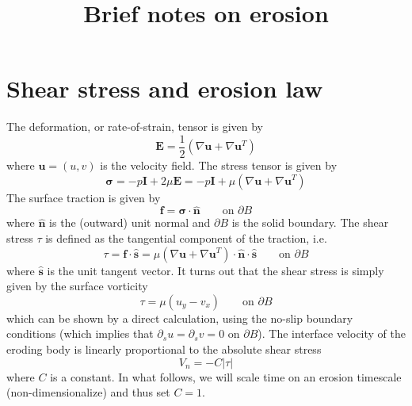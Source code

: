 \documentclass[11pt]{article}
\newcommand{\pdi}[2] { {\partial_#2} #1 }
\newcommand{\grad}{\nabla}
\newcommand{\bvec}[1]{\ensuremath{\boldsymbol{#1}}}
\newcommand{\abs}[1]{\left| #1 \right|}
\newcommand {\bu} {\bvec{u}}
\newcommand{\nhat}{\hat{\bvec{n}}}
\newcommand{\shat}{\hat{\bvec{s}}}
\newcommand{\atau}{\abs{\tau}}
\newcommand {\bdry} {\partial B}
\newcommand {\onBdry} {\text{on } \bdry }
\begin{document}
\title{Brief notes on erosion}
\author{}
\maketitle


\section{Shear stress and erosion law}
The deformation, or rate-of-strain, tensor is given by
\begin{equation}
\bvec{E} = \frac{1}{2} \left( \grad \bu + \grad \bu^T \right)
\end{equation}
where $\bu = (u,v)$ is the velocity field. The stress tensor is given by
\begin{equation}
\bvec{\sigma} = -p \bvec{I} + 2 \mu \bvec{E} = -p \bvec{I} + \mu \left( \grad \bu + \grad \bu^T \right)
\end{equation}
The surface traction is given by
\begin{equation}
\bvec{f} = \bvec{\sigma} \cdot \nhat 	\qquad \onBdry
\end{equation}
where $\nhat$ is the (outward) unit normal and $\bdry$ is the solid boundary. The shear stress $\tau$ is defined as the tangential component of the traction, i.e.~
\begin{equation}
\label{stressdef}
\tau = \bvec{f} \cdot \shat 
= \mu \left( \grad \bu + \grad \bu^T \right) \cdot \nhat \cdot \shat	\qquad \onBdry
\end{equation}
where $\shat$ is the unit tangent vector. It turns out that the shear stress is simply given by the surface vorticity
\begin{equation}
\tau = \mu \left( u_y - v_x \right) \qquad \onBdry
\end{equation}
which can be shown by a direct calculation, using the no-slip boundary conditions (which implies that $\pdi{u}{s} = \pdi{v}{s} = 0$ on $\bdry$).
The interface velocity of the eroding body is linearly proportional to the absolute shear stress
\begin{equation}
V_n = -C \atau
\end{equation}
where $C$ is a constant. In what follows, we will scale time on an erosion timescale (non-dimensionalize) and thus set $C=1$.
\end{document}
